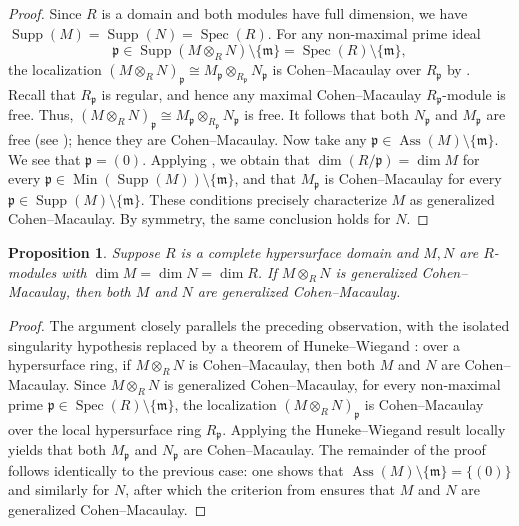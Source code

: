 \documentclass[11pt,a4paper]{amsart}
\numberwithin{equation}{section}
\newtheorem{proposition}[theorem]{Proposition}
\theoremstyle{definition}
\theoremstyle{remark}
\newcommand{\Ass}{\operatorname{Ass}}
\newcommand{\Spec}{\operatorname{Spec}}
\begin{document}
\begin{proof}
	Since \(R\) is a domain and both modules have full dimension, we have \(\operatorname{Supp}(M) = \operatorname{Supp}(N) = \operatorname{Spec}(R)\). For any non-maximal prime ideal
	\[
	\mathfrak{p} \in \operatorname{Supp}(M \otimes_R N) \setminus \{\mathfrak{m}\} = \operatorname{Spec}(R) \setminus \{\mathfrak{m}\},
	\]
	the localization
	\(
	(M \otimes_R N)_{\mathfrak{p}} \cong M_{\mathfrak{p}} \otimes_{R_{\mathfrak{p}}} N_{\mathfrak{p}}
	\)
	is Cohen--Macaulay over \(R_{\mathfrak{p}}\) by \cite[Ex.~9.5(1)]{BH}.	
	Recall that \(R_{\mathfrak{p}}\) is regular, and hence any maximal Cohen--Macaulay \(R_{\mathfrak{p}}\)-module is free. Thus,
	\(
	(M \otimes_R N)_{\mathfrak{p}} \cong M_{\mathfrak{p}} \otimes_{R_{\mathfrak{p}}} N_{\mathfrak{p}}
	\)
	is free. It follows that both \(N_{\mathfrak{p}}\) and \(M_{\mathfrak{p}}\) are free (see \cite[3.4.7]{BJ}); hence they are Cohen--Macaulay.
	Now take any \(\mathfrak{p} \in \operatorname{Ass}(M) \setminus \{\mathfrak{m}\}\). We see that \(\mathfrak{p} = (0)\). Applying \cite[Ex.~9.5.7(b)]{BSh}, we obtain that
	\(
	\dim(R/\mathfrak{p}) = \dim M
	\)
	for every \(\mathfrak{p} \in \operatorname{Min}(\operatorname{Supp}(M)) \setminus \{\mathfrak{m}\}\), and that \(M_{\mathfrak{p}}\) is Cohen--Macaulay for every \(\mathfrak{p} \in \operatorname{Supp}(M) \setminus \{\mathfrak{m}\}\). These conditions precisely characterize \(M\) as generalized Cohen--Macaulay. By symmetry, the same conclusion holds for \(N\).
\end{proof}

	\begin{proposition}
		Suppose \(R\) is a complete hypersurface domain and \(M,N\) are \(R\)-modules with \(\dim M=\dim N=\dim R\). If \(M\otimes_R N\) is generalized Cohen--Macaulay, then both \(M\) and \(N\) are generalized Cohen--Macaulay.
	\end{proposition}
	
	\begin{proof}
		The argument closely parallels the preceding observation, with the isolated singularity hypothesis replaced by a theorem of Huneke--Wiegand \cite[3.1]{tensor}: over a hypersurface ring, if \(M\otimes_R N\) is Cohen--Macaulay, then both \(M\) and \(N\) are Cohen--Macaulay. Since \(M\otimes_R N\) is generalized Cohen--Macaulay, for every non-maximal prime \(\mathfrak{p}\in\Spec(R)\setminus\{\mathfrak{m}\}\), the localization \((M\otimes_R N)_{\mathfrak{p}}\) is Cohen--Macaulay over the local hypersurface ring \(R_{\mathfrak{p}}\). Applying the Huneke--Wiegand result locally yields that both \(M_{\mathfrak{p}}\) and \(N_{\mathfrak{p}}\) are  Cohen--Macaulay. The remainder of the proof follows identically to the previous case: one shows that \(\Ass(M)\setminus\{\mathfrak{m}\}=\{(0)\}\) and similarly for \(N\), after which the criterion from \cite[Ex.~9.5.7(b)]{BSh} ensures that \(M\) and \(N\) are generalized Cohen--Macaulay.
	\end{proof}
	
\end{document}
